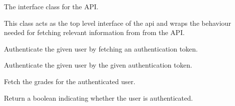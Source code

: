 \documentclass[letterpaper,10pt,english]{sphinxmanual}
\begin{document}
\begin{fulllineitems}
\label{cv_kickstarter:cv_kickstarter.cnapi.CampusNetApi}
The interface class for the API.

This class acts as the top level interface of the api and wraps the
behaviour needed for fetching relevant information from from the API.

\begin{fulllineitems}
\label{cv_kickstarter:cv_kickstarter.cnapi.CampusNetApi.authenticate}
Authenticate the given user by fetching an authentication token.

\end{fulllineitems}


\begin{fulllineitems}
\label{cv_kickstarter:cv_kickstarter.cnapi.CampusNetApi.authenticate_with_token}
Authenticate the given user by the given authentication token.

\end{fulllineitems}


\begin{fulllineitems}
\label{cv_kickstarter:cv_kickstarter.cnapi.CampusNetApi.grades}
Fetch the grades for the authenticated user.

\end{fulllineitems}


\begin{fulllineitems}
\label{cv_kickstarter:cv_kickstarter.cnapi.CampusNetApi.is_authenticated}
Return a boolean indicating whether the user is authenticated.

\end{fulllineitems}


\end{fulllineitems}
\end{document}
